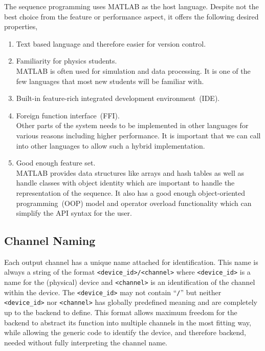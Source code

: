 The sequence programming uses MATLAB as the host language.
Despite not the best choice from the feature or performance aspect,
it offers the following desired properties,
\begin{enumerate}
\item Text based language and therefore easier for version control.
\item Familiarity for physics students.\\
  MATLAB is often used for simulation and data processing.
  It is one of the few languages that most new students will be familiar with.
\item Built-in feature-rich integrated development environment~(IDE).
\item Foreign function interface~(FFI).\\
  Other parts of the system needs to be implemented in other languages
  for various reasons including higher performance.
  It is important that we can call into other languages to allow such a hybrid implementation.
\item Good enough feature set.\\
  MATLAB provides data structures like arrays and hash tables
  as well as handle classes with object identity
  which are important to handle the representation of the sequence.
  It also has a good enough object-oriented programming~(OOP) model
  and operator overload functionality which can simplify the API syntax for the user.
\end{enumerate}

\subsection{Channel Naming}
\label{ch:computer-control:frontend:channel}
Each output channel has a unique name attached for identification.
This name is always a string of the format \lstinline{<device_id>/<channel>}
where \lstinline{<device_id>} is a name for the (physical) device
and \lstinline{<channel>} is an identification of the channel within the device.
The \lstinline{<device_id>} may not contain ``\lstinline{/}'' but
neither \lstinline{<device_id>} nor \lstinline{<channel>} has globally predefined meaning
and are completely up to the backend to define.
This format allows maximum freedom for the backend to abstract its function
into multiple channels in the most fitting way,
while allowing the generic code to identify the device, and therefore backend,
needed without fully interpreting the channel name.

